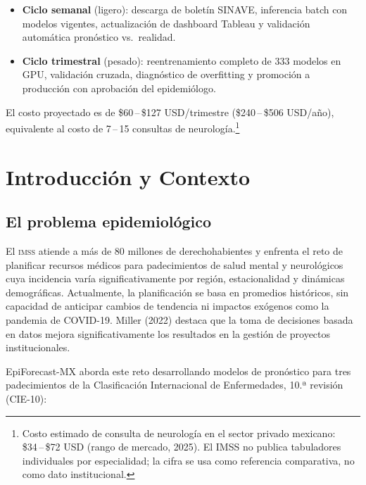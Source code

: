 \documentclass[12pt, letterpaper]{article}
\newcommand{\imss}{\textnormal{\textsc{imss}}}
\begin{document}
\begin{itemize}[noitemsep]
    \item \textbf{Ciclo semanal} (ligero): descarga de boletín SINAVE, inferencia batch con modelos vigentes, actualización de dashboard Tableau y validación automática pronóstico vs.\ realidad.
    \item \textbf{Ciclo trimestral} (pesado): reentrenamiento completo de 333 modelos en GPU, validación cruzada, diagnóstico de overfitting y promoción a producción con aprobación del epidemiólogo.
\end{itemize}

El costo proyectado es de \$60\,--\,\$127 USD/trimestre (\$240\,--\,\$506 USD/año), equivalente al costo de 7\,--\,15 consultas de neurología.\footnote{Costo estimado de consulta de neurología en el sector privado mexicano: \$34\,--\,\$72 USD (rango de mercado, 2025). El IMSS no publica tabuladores individuales por especialidad; la cifra se usa como referencia comparativa, no como dato institucional.}

\newpage
\section{Introducción y Contexto}\label{sec:introduccion}

\subsection{El problema epidemiológico}

El {\imss} atiende a más de 80 millones de derechohabientes y enfrenta el reto de planificar recursos médicos para padecimientos de salud mental y neurológicos cuya incidencia varía significativamente por región, estacionalidad y dinámicas demográficas. Actualmente, la planificación se basa en promedios históricos, sin capacidad de anticipar cambios de tendencia ni impactos exógenos como la pandemia de COVID-19. Miller (2022) destaca que la toma de decisiones basada en datos mejora significativamente los resultados en la gestión de proyectos institucionales.

EpiForecast-MX aborda este reto desarrollando modelos de pronóstico para tres padecimientos de la Clasificación Internacional de Enfermedades, 10.ª revisión (CIE-10):
\end{document}
